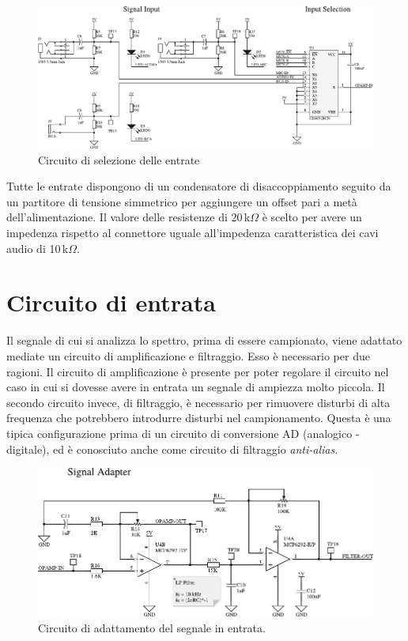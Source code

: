 \begin{figure}[H] \centering
    \includegraphics[width=.9\linewidth]{figures/circuits/input-selection-v2.pdf}
    \caption{Circuito di selezione delle entrate \label{fig:input-selection-v2}}
\end{figure}

Tutte le entrate dispongono di un condensatore di disaccoppiamento seguito da
un partitore di tensione simmetrico per aggiungere un offset pari a met\`a
dell'alimentazione. Il valore delle resistenze di 20\,k\(\Omega\) \`e scelto
per avere un impedenza rispetto al connettore uguale all'impedenza
caratteristica dei cavi audio di 10\,k\(\Omega\).

\section{Circuito di entrata}
Il segnale di cui si analizza lo spettro, prima di essere campionato, viene
adattato mediate un circuito di amplificazione e filtraggio. Esso \`e
necessario per due ragioni. Il circuito di amplificazione \`e presente per
poter regolare il circuito nel caso in cui si dovesse avere in entrata un
segnale di ampiezza molto piccola. Il secondo circuito invece, di filtraggio,
\`e necessario per rimuovere disturbi di alta frequenza che potrebbero
introdurre disturbi nel campionamento. Questa \`e una tipica configurazione
prima di un circuito di conversione AD (analogico - digitale), ed \`e
conosciuto anche come circuito di filtraggio \emph{anti-alias}.

\begin{figure}[H] \centering
    \includegraphics[width=.9\linewidth]{figures/circuits/filter-ampl-v2.pdf}
    \caption[Circuito di adattamento del segnale]{
        Circuito di adattamento del segnale in entrata.
        \label{fig:filter-ampl-v2}
    }
\end{figure}

